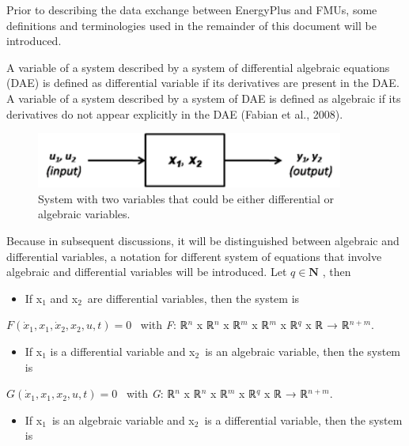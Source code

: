 Prior to describing the data exchange between EnergyPlus and FMUs, some definitions and terminologies used in the remainder of this document will be introduced.

A variable of a system described by a system of differential algebraic equations (DAE) is defined as differential variable if its derivatives are present in the DAE. A variable of a system described by a system of DAE is defined as algebraic if its derivatives do not appear explicitly in the DAE (Fabian et al., 2008).

\begin{figure}[hbtp] %
\centering
\includegraphics[width=0.9\textwidth, height=0.9\textheight, keepaspectratio=true]{media/image008.png}
\caption{System with two variables that could be either differential or algebraic variables. \protect \label{fig:system-with-two-variables-that-could-be}}
\end{figure}

Because in subsequent discussions, it will be distinguished between algebraic and differential variables, a notation for different system of equations that involve algebraic and differential variables will be introduced. Let \(q\in\mathbf{N}\) , then

\begin{itemize}
\tightlist
\item
  If x\(_{1}\) and x\(_{2}\)~are differential variables, then the system is
\end{itemize}

\(F\left(\dot x_1,x_1,\dot x_2,x_2,u,t\right) = 0\) ~with \emph{F}: ℝ\(^{n}\) x ℝ\(^{n}\) x ℝ\(^{m}\) x ℝ\(^{m}\) x ℝ\(^{q}\) x ℝ → ℝ\(^{n+m}\).

\begin{itemize}
\tightlist
\item
  If x\(_{1}\) is a differential variable and x\(_{2}\)~is an algebraic variable, then the system is
\end{itemize}

\(G\left(\dot x_1,x_1,x_2,u,t\right) = 0\) ~with \emph{G}: ℝ\(^{n}\) x ℝ\(^{n}\) x ℝ\(^{m}\) x ℝ\(^{q}\) x ℝ → ℝ\(^{n+m}\).

\begin{itemize}
\tightlist
\item
  If x\(_{1}\)~is an algebraic variable and x\(_{2}\)~is a differential variable, then the system is
\end{itemize}

